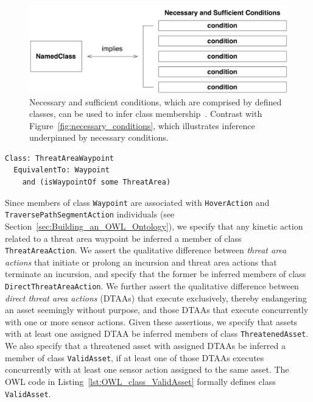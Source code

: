\begin{figure}[ht]
\centering
\includegraphics[scale=0.58]{img/necessary-and-sufficient-conditions.pdf}
\caption[Defined classes]{Necessary and sufficient conditions, which are comprised by defined classes, can be used to infer class membership~\cite{Horridge_2011}. Contrast with Figure~\ref{fig:necessary_conditions}, which illustrates inference underpinned by necessary conditions.}
\label{fig:necessary_and_sufficient_conditions}
\end{figure}

\begin{lstlisting}[caption={OWL code for class \texttt{ThreatAreaWaypoint}},label=lst:OWL_class_ThreatAreaWaypoint]
Class: ThreatAreaWaypoint
  EquivalentTo: Waypoint
    and (isWaypointOf some ThreatArea)
\end{lstlisting}

Since members of class \texttt{Waypoint} are associated with \texttt{HoverAction} and \texttt{Traverse\-PathSegmentAction} individuals (see Section~\ref{sec:Building_an_OWL_Ontology}), we specify that any kinetic action related to a threat area waypoint be inferred a member of class \texttt{ThreatAreaAction}. We assert the qualitative difference between \emph{threat area actions} that initiate or prolong an incursion and threat area actions that terminate an incursion, and specify that the former be inferred members of class \texttt{DirectThreatAreaAction}. We further assert the qualitative difference between \emph{direct threat area actions} (DTAAs) that execute exclusively, thereby endangering an asset seemingly without purpose, and those DTAAs that execute concurrently with one or more sensor actions. Given these assertions, we specify that assets with at least one assigned DTAA be inferred members of class \texttt{ThreatenedAsset}. We also specify that a threatened asset with assigned DTAAs be inferred a member of class \texttt{ValidAsset}, if at least one of those DTAAs executes concurrently with at least one sensor action assigned to the same asset. The OWL code in Listing~\ref{lst:OWL_class_ValidAsset} formally defines class \texttt{ValidAsset}.

